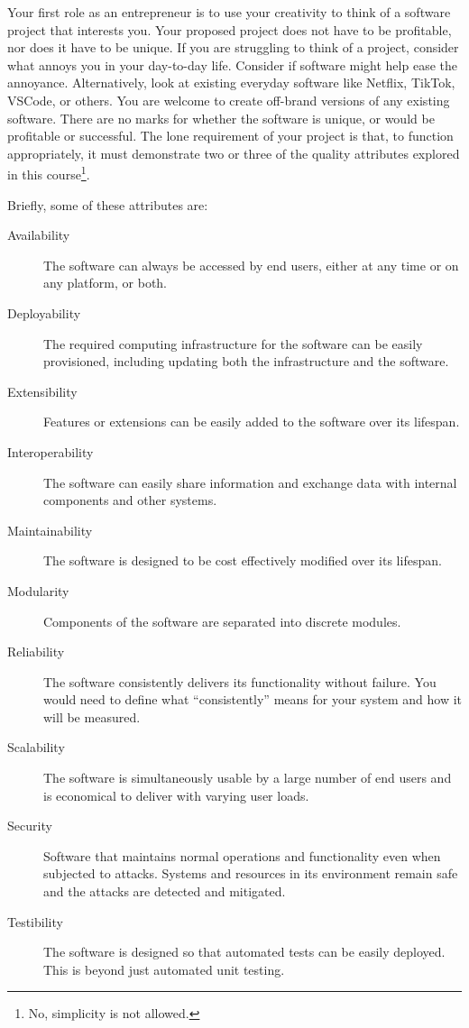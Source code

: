 \documentclass{csse4400}
\begin{document}
Your first role as an entrepreneur is to use your creativity to think of a software project that interests you.
Your proposed project does not have to be profitable, nor does it have to be unique.
If you are struggling to think of a project, consider what annoys you in your day-to-day life.
Consider if software might help ease the annoyance.
Alternatively, look at existing everyday software like Netflix, TikTok, VSCode, or others.
You are welcome to create off-brand versions of any existing software.
There are no marks for whether the software is unique, or would be profitable or successful.
The lone requirement of your project is that, to function appropriately, it must demonstrate two or three of the quality attributes 
explored in this course\footnote{No, simplicity is not allowed.}.

\newpage\noindent
Briefly, some of these attributes are:
\begin{description}
    \item[Availability] The software can always be accessed by end users, either at any time or on any platform, or both.
    \item[Deployability] The required computing infrastructure for the software can be easily provisioned, including updating both the infrastructure and the software.
    \item[Extensibility] Features or extensions can be easily added to the software over its lifespan.
    \item[Interoperability] The software can easily share information and exchange data with internal components and other systems.
    \item[Maintainability] The software is designed to be cost effectively modified over its lifespan.
    \item[Modularity] Components of the software are separated into discrete modules.
    \item[Reliability] The software consistently delivers its functionality without failure. You would need to define what ``consistently'' means for your system and how it will be measured.
    \item[Scalability] The software is simultaneously usable by a large number of end users and is economical to deliver with varying user loads.
    \item[Security] Software that maintains normal operations and functionality even when subjected to attacks.
                    Systems and resources in its environment remain safe and the attacks are detected and mitigated.
    \item[Testibility] The software is designed so that automated tests can be easily deployed. This is beyond just automated unit testing.
\end{description}
\end{document}

